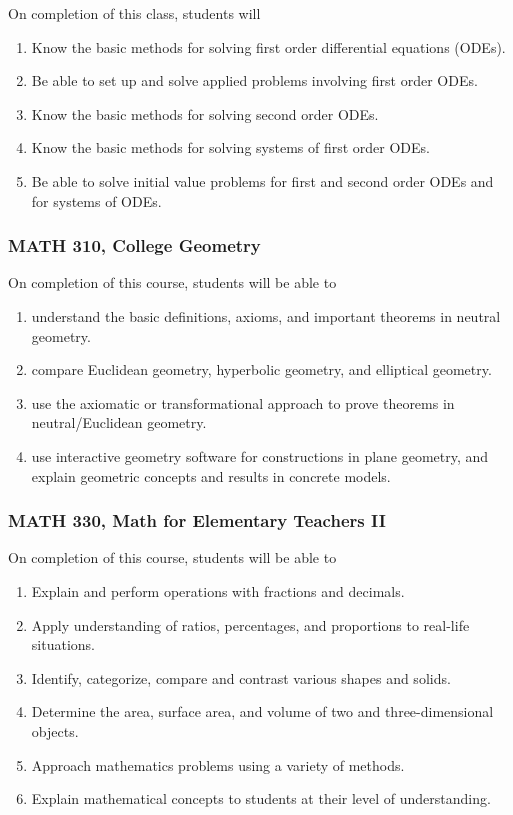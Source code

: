 \documentclass[10pt]{article}
\newenvironment{alphalist}{
\begin{enumerate}[label=(\arabic*),widest=107 ,leftmargin=25pt, itemsep=0pt]}
{\end{enumerate}}
\begin{document}
On completion of this class, students will
\begin{alphalist}
    \item Know the basic methods for solving first order differential equations (ODEs).
    \item Be able to set up and solve applied problems involving first order ODEs.
    \item Know the basic methods for solving second order ODEs.
    \item Know the basic methods for solving systems of first order ODEs.
    \item Be able to solve initial value problems for first and second order ODEs and for systems of ODEs.
\end{alphalist}

\subsubsection*{MATH 310, College Geometry}

On completion of this course, students will be able to
\begin{alphalist}
    \item understand the basic definitions, axioms, and important theorems in neutral geometry.
    \item compare Euclidean geometry, hyperbolic geometry, and elliptical geometry.
    \item use the axiomatic or transformational approach to prove theorems in neutral/Euclidean geometry.
    \item use interactive geometry software for constructions in plane geometry, and
    explain geometric concepts and results in concrete models.
\end{alphalist}

\subsubsection*{MATH 330, Math for Elementary Teachers II}

On completion of this course, students will be able to
\begin{alphalist}
\item Explain and perform operations with fractions and decimals. 
\item Apply understanding of ratios, percentages, and proportions to real-life situations. 
\item Identify, categorize, compare and contrast various shapes and solids. 
\item Determine the area, surface area, and volume of two and three-dimensional objects. 
\item Approach mathematics problems using a variety of methods. 
\item Explain mathematical concepts to students at their level of understanding.
\end{alphalist}
\end{document}
